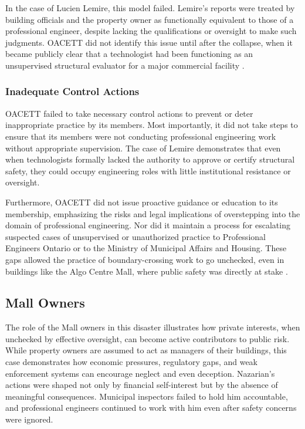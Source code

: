 \documentclass[12pt]{article}
\begin{document}
In the case of Lucien Lemire, this model failed. Lemire's reports were treated by building officials and the property owner as functionally equivalent to those of a professional engineer, despite lacking the qualifications or oversight to make such judgments. OACETT did not identify this issue until after the collapse, when it became publicly clear that a technologist had been functioning as an unsupervised structural evaluator for a major commercial facility \cite[p399]{AlgoLakeReport1}.

\subsubsection*{Inadequate Control Actions}

OACETT failed to take necessary control actions to prevent or deter inappropriate practice by its members. Most importantly, it did not take steps to ensure that its members were not conducting professional engineering work without appropriate supervision. The case of Lemire demonstrates that even when technologists formally lacked the authority to approve or certify structural safety, they could occupy engineering roles with little institutional resistance or oversight.

Furthermore, OACETT did not issue proactive guidance or education to its membership, emphasizing the risks and legal implications of overstepping into the domain of professional engineering. Nor did it maintain a process for escalating suspected cases of unsupervised or unauthorized practice to Professional Engineers Ontario or to the Ministry of Municipal Affairs and Housing. These gaps allowed the practice of boundary-crossing work to go unchecked, even in buildings like the Algo Centre Mall, where public safety was directly at stake \cite[p398-400]{AlgoLakeReport1}.

\subsection{Mall Owners}

The role of the Mall owners in this disaster illustrates how private interests, when unchecked by effective oversight, can become active contributors to public risk. While property owners are assumed to act as managers of their buildings, this case demonstrates how economic pressures, regulatory gaps, and weak enforcement systems can encourage neglect and even deception. Nazarian's actions were shaped not only by financial self-interest but by the absence of meaningful consequences. Municipal inspectors failed to hold him accountable, and professional engineers continued to work with him even after safety concerns were ignored.
\end{document}
